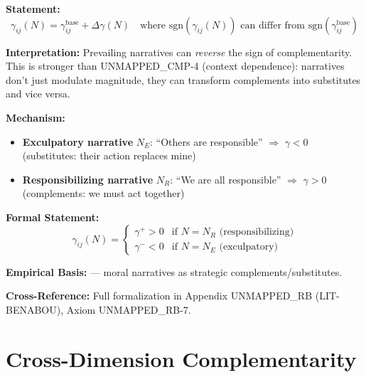 \begin{tcolorbox}[colback=gray!5!white, colframe=gray!75!black,
    title=Axiom UNMAPPED_CMP-11: Narrative Modulation of Complementarity]
\textbf{Statement:}
\begin{equation}
\gamma_{ij}(N) = \gamma_{ij}^{\text{base}} + \Delta\gamma(N) \quad \text{where } \text{sgn}(\gamma_{ij}(N)) \text{ can differ from } \text{sgn}(\gamma_{ij}^{\text{base}})
\end{equation}

\textbf{Interpretation:} Prevailing narratives can \emph{reverse} the sign of complementarity.
This is stronger than UNMAPPED_CMP-4 (context dependence): narratives don't just modulate magnitude,
they can transform complements into substitutes and vice versa.

\textbf{Mechanism:}
\begin{itemize}[nosep]
\item \textbf{Exculpatory narrative} $N_E$: ``Others are responsible'' $\Rightarrow$ $\gamma < 0$ (substitutes: their action replaces mine)
\item \textbf{Responsibilizing narrative} $N_R$: ``We are all responsible'' $\Rightarrow$ $\gamma > 0$ (complements: we must act together)
\end{itemize}

\textbf{Formal Statement:}
\begin{equation}
\gamma_{ij}(N) = \begin{cases}
\gamma^{+} > 0 & \text{if } N = N_R \text{ (responsibilizing)} \\
\gamma^{-} < 0 & \text{if } N = N_E \text{ (exculpatory)}
\end{cases}
\end{equation}

\textbf{Empirical Basis:} \citet{benabou2018narratives} --- moral narratives as strategic complements/substitutes.

\textbf{Cross-Reference:} Full formalization in Appendix UNMAPPED_RB (LIT-BENABOU), Axiom UNMAPPED_RB-7.
\end{tcolorbox}


\section{Cross-Dimension Complementarity}
\label{sec:how-dimension}

